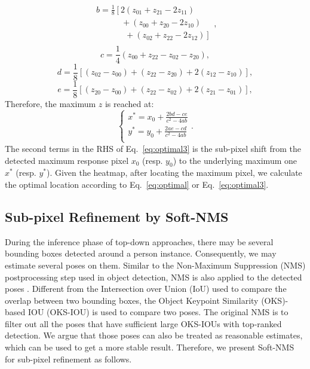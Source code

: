 \documentclass[twocolumn]{svjour3}          \smartqed  \usepackage{natbib}
\begin{document}
\begin{equation}
\begin{array}{c}
b = \frac{1}{8}\left[ {2\left( {{z_{01}} + {z_{21}} - 2{z_{11}}} \right)} \right. \\
  \qquad \quad + \left( {{z_{00}} + {z_{20}} - 2{z_{10}}} \right) \\
  \qquad \quad \ \ + \left. {\left( {{z_{02}} + {z_{22}} - 2{z_{12}}} \right)} \right] \\
 \end{array},
\label{eq:b}
\end{equation}
\begin{equation}
c = \frac{1}{4}\left( {{z_{00}} + {z_{22}} - {z_{02}} - {z_{20}}} \right),
\label{eq:c}
\end{equation}
\begin{equation}
d = \frac{1}{8}\left[ {\left( {{z_{02}} - {z_{00}}} \right) + \left( {{z_{22}} - {z_{20}}} \right) + 2\left( {{z_{12}} - {z_{10}}} \right)} \right],
\label{eq:d}
\end{equation}
\begin{equation}
e = \frac{1}{8}\left[ {\left( {{z_{20}} - {z_{00}}} \right) + \left( {{z_{22}} - {z_{02}}} \right) + 2\left( {{z_{21}} - {z_{01}}} \right)} \right],
\label{eq:e}
\end{equation}
Therefore, the maximum $z$ is reached at:
\begin{equation}
\left\{ \begin{array}{l}
 {x^*} = x_0 + \frac{{2bd - ce}}{{{c^2} - 4ab}} \\
 {y^*} = y_0 + \frac{{2ae - cd}}{{{c^2} - 4ab}} \\
 \end{array} \right..
\label{eq:optimal3}
\end{equation}
The second terms in the RHS of Eq.~\eqref{eq:optimal3} is the sub-pixel shift from the detected maximum response pixel $x_0$ (resp. $y_0$) to the underlying maximum one $x^*$ (resp. $y^*$). Given the heatmap, after locating the maximum pixel, we calculate the optimal location according to Eq.~\eqref{eq:optimal} or Eq.~\eqref{eq:optimal3}.

\subsection{Sub-pixel Refinement by Soft-NMS}
\label{subsec:softnms}

During the inference phase of top-down approaches, there may be several bounding boxes detected around a person instance. Consequently, we may estimate several poses on them. Similar to the Non-Maximum Suppression (NMS) postprocessing step used in object detection, NMS is also applied to the detected poses \citep{chen2018cascaded,xiao2018simple,sun2019deep}. Different from the Intersection over Union (IoU) used to compare the overlap between two bounding boxes, the Object Keypoint Similarity (OKS)-based IOU (OKS-IOU) is used to compare two poses. The original NMS is to filter out all the poses that have sufficient large OKS-IOUs with top-ranked detection. We argue that those poses can also be treated as reasonable estimates, which can be used to get a more stable result. Therefore, we present Soft-NMS for sub-pixel refinement as follows.
\end{document}

